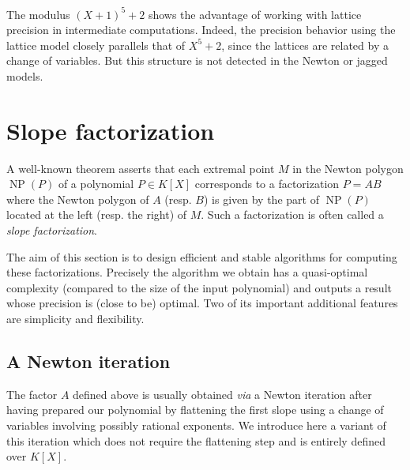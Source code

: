 \documentclass{sig-alternate-05-2015}
\DeclareMathOperator{\NP}{NP}
\theoremstyle{definition}
\begin{document}
The modulus $(X+1)^5 + 2$ shows the advantage of working
with lattice precision in intermediate computations.  Indeed,
the precision behavior using the lattice model closely parallels
that of $X^5+2$, since the lattices are related by a change of
variables.  But this structure is not detected in the Newton
or jagged models.

\section{Slope factorization} \label{sec:slope_fac}

A well-known theorem \cite[Theorem~6.1]{dwork-geratto-sullivan:Gfunctions} asserts that each 
extremal point $M$ in the Newton polygon $\NP(P)$ of a polynomial $P \in 
K[X]$ corresponds to a factorization $P = AB$ where the Newton polygon 
of $A$ (resp. $B$) is given by the part of $\NP(P)$ located at the left 
(resp. the right) of $M$. Such a factorization is often called a 
\emph{slope factorization}.

The aim of this section is to design efficient and stable algorithms 
for computing these factorizations. Precisely the algorithm we obtain 
has a quasi-optimal complexity (compared to the size of the input 
polynomial) and outputs a result whose precision is (close to be) 
optimal. Two of its important additional features are simplicity and 
flexibility.

\subsection{A Newton iteration}
\label{ssec:Newtoniter}

The factor $A$ defined above is usually obtained \emph{via} a Newton 
iteration after having prepared our polynomial by flattening the first 
slope using a change of variables involving possibly rational 
exponents. We introduce here a variant of this iteration which does not 
require the flattening step and is entirely defined over $K[X]$.
\end{document}
